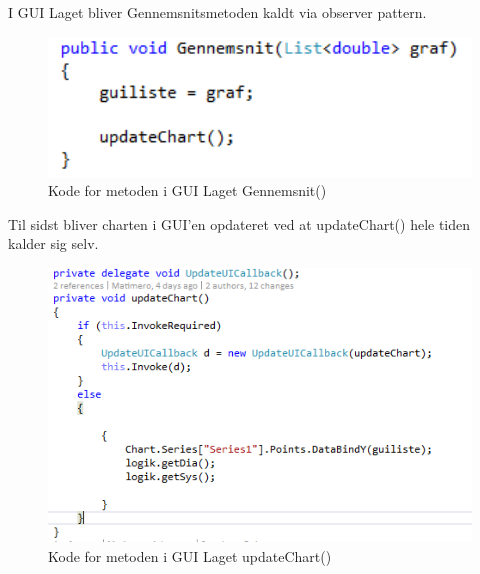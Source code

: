 I GUI Laget bliver Gennemsnitsmetoden kaldt via observer pattern.

\begin{figure}[H]
	\centering
	\includegraphics[width=1.0\textwidth]{FigurerProgram/GennemsnitGUI}
	\caption{Kode for metoden i GUI Laget Gennemsnit()}
\end{figure}

Til sidst bliver charten i GUI'en opdateret ved at updateChart() hele tiden kalder sig selv.

\begin{figure}[H]
	\centering
	\includegraphics[width=1.0\textwidth]{FigurerProgram/updateChart}
	\caption{Kode for metoden i GUI Laget updateChart()}
\end{figure}


